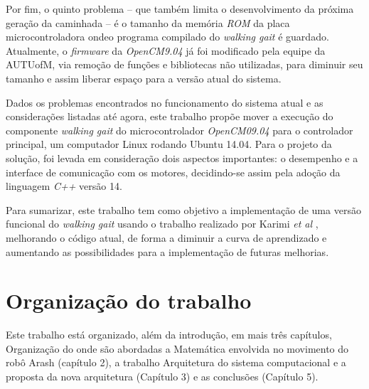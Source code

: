 Por fim, o quinto problema -- que também limita o desenvolvimento da próxima geração da caminhada -- é o tamanho da memória \textit{ROM} da placa microcontroladora ondeo programa compilado do \textit{walking gait} é guardado. Atualmente, o \textit{firmware} da \textit{OpenCM9.04} já foi modificado pela equipe da AUTUofM, via remoção de funções e bibliotecas não utilizadas, para diminuir seu tamanho e  assim liberar espaço para a versão atual do sistema.

Dados os problemas encontrados no funcionamento do sistema atual e as considerações listadas até agora, este trabalho propõe mover a execução do componente \textit{walking gait} do microcontrolador \textit{OpenCM09.04} para o controlador principal, um computador Linux rodando Ubuntu 14.04. Para o projeto da solução, foi levada em consideração dois aspectos importantes: o desempenho e a interface de comunicação com os motores, decidindo-se assim pela adoção da linguagem \textit{C++} versão 14.

Para sumarizar, este trabalho tem como objetivo a implementação de uma versão funcional do \textit{walking gait} usando o trabalho realizado por Karimi \textit{et al} \cite{karimionline}, melhorando o código atual, de forma a diminuir a curva de aprendizado e aumentando as possibilidades para a implementação de futuras melhorias.

\section{Organização do trabalho}

Este trabalho está organizado, além da introdução, em mais três capítulos, Organização do onde são abordadas a Matemática envolvida no movimento do robô Arash (capítulo 2), a trabalho Arquitetura do sistema computacional e a proposta da nova arquitetura (Capítulo 3) e as conclusões (Capítulo 5).